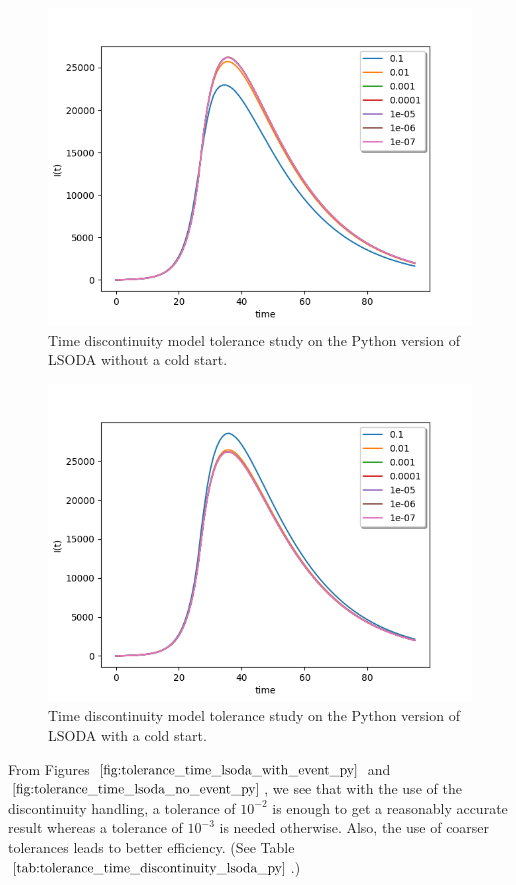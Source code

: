 \begin{figure}[H]
\centering
\includegraphics[width=0.7\linewidth]{./figures/tolerance_time_lsoda_no_event_py}
\caption{Time discontinuity model tolerance study on the Python version of LSODA without a cold start.}
\label{fig:tolerance_time_lsoda_no_event_py}
\end{figure}

\begin{figure}[H]
\centering
\includegraphics[width=0.7\linewidth]{./figures/tolerance_time_lsoda_with_event_py}
\caption{Time discontinuity model tolerance study on the Python version of LSODA with a cold start.}
\label{fig:tolerance_time_lsoda_with_event_py}
\end{figure}

From Figures $\ref{fig:tolerance_time_lsoda_with_event_py}$ and $\ref{fig:tolerance_time_lsoda_no_event_py}$, we see that with the use of the discontinuity handling, a tolerance of $10^{-2}$ is enough to get a reasonably accurate result whereas a tolerance of $10^{-3}$ is needed otherwise. Also, the use of coarser tolerances leads to better efficiency. (See Table $\ref{tab:tolerance_time_discontinuity_lsoda_py}$.)

